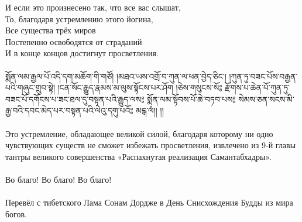 И если это произнесено так, что все вас слышат, \\
То, благодаря устремлению этого йогина, \\
Все существа трёх миров \\
Постепенно освободятся от страданий \\
И в конце концов достигнут просветления.\\
\\
{\ti
སྨོན་ལམ་རྒྱལ་པོ་འདི་དག་མཆོག་གི་གཙོ། །མཐའ་ཡས་འགྲོ་བ་ཀུན་ལ་ཕན་བྱེད་ཅིང་།
།ཀུན་ཏུ་བཟང་པོས་བརྒྱན་པའི་གཞུང་གྲུབ་སྟེ།
།ངན་སོང་རྒྱུད་རྣམས་མ་ལུས་སྟོངས་པར་ཤོག
།ཅེས་གསུངས་སོ༔ རྫོགས་པ་ཆེན་པོ་ཀུན་ཏུ་བཟང་པོ་དགོངས་པ་ཟང་ཐལ་དུ་བསྟན་པའི་རྒྱུད་ལས༔
སྨོན་ལམ་སྟོབས་པོ་ཆེ་བཏབ་པས༔
སེམས་ཅན་སངས་མི་རྒྱ་བའི་དབང་མེད་པར་བསྟན་པའི་ལེའུ་དགུ་པའོ༔ མངྒ་ལཾ།། །།}\\
\\
\scriptsize
Это устремление, обладающее великой силой, благодаря которому 
ни одно чувствующих существ не сможет избежать просветления, 
извлечено из 9-й главы тантры великого совершенства «Распахнутая 
реализация Самантабхадры».\\
\\
Во благо! Во благо! Во благо!\\
\\
Перевёл с тибетского Лама Сонам Дордже в День Снисхождения Будды из мира богов.
\normalsize
